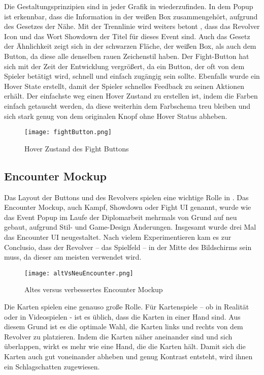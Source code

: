 Die Gestaltungsprinzipien sind in jeder Grafik in \FF wiederzufinden. In dem Popup ist erkennbar, dass die
Information in der weißen Box zusammengehört, aufgrund des Gesetzes der Nähe. Mit der Trennlinie wird weiters betont
, dass das Revolver Icon und das Wort Showdown der Titel für dieses Event sind. Auch das Gesetz der Ähnlichkeit zeigt
sich in der schwarzen Fläche, der weißen Box, als auch dem Button, da diese alle denselben rauen Zeichenstil haben.
Der Fight-Button hat sich mit der Zeit der Entwicklung vergrößert, da ein Button, der oft von dem Spieler betätigt
wird, schnell und einfach zugängig sein sollte. Ebenfalls wurde ein Hover State erstellt, damit der Spieler schnelles
Feedback zu seinen Aktionen erhält. Der einfachste weg einen Hover Zustand zu erstellen ist, indem die Farben einfach
getauscht werden, da diese weiterhin dem Farbschema treu bleiben und sich stark genug von dem originalen Knopf ohne
Hover Status abheben. 

\begin{figure}[H]
    \centering
    \texttt{[image: fightButton.png]}
    \caption{Hover Zustand des Fight Buttons}
\end{figure}

\subsection{Encounter Mockup}

Das Layout der Buttons und des Revolvers spielen eine wichtige Rolle in \FF. Das Encounter Mockup, auch Kampf, Showdown oder Fight UI genannt, wurde wie das Event Popup im Laufe der Diplomarbeit mehrmals von Grund auf neu gebaut, aufgrund Stil- und Game-Design Änderungen. Insgesamt wurde drei Mal das Encounter UI neugestaltet. Nach vielem Experimentieren kam es zur Conclusio, dass der Revolver – das Spielfeld – in der Mitte des Bildschirms sein muss, da dieser am meisten verwendet wird.

\begin{figure}[H]
    \centering
    \texttt{[image: altVsNeuEncounter.png]}
    \caption{Altes versus verbessertes Encounter Mockup}
\end{figure}

Die Karten spielen eine genauso große Rolle. Für Kartenspiele – ob in Realität oder in Videospielen - ist es üblich, dass die Karten in einer Hand sind. Aus diesem Grund ist es die optimale Wahl, die Karten links und rechts von dem Revolver zu platzieren. Indem die Karten näher aneinander sind und sich überlappen, wirkt es mehr wie eine Hand, die die Karten hält. Damit sich die Karten auch gut voneinander abheben und genug Kontrast entsteht, wird ihnen ein Schlagschatten zugewiesen.

